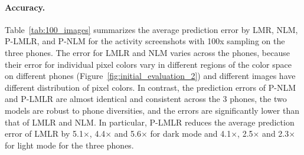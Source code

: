 \paragraph{Accuracy.}
Table~\ref{tab:100_images}
summarizes the average prediction error by LMR, NLM, P-LMLR, and P-NLM
for the activity screenshots with 100x sampling on the three phones.
The error for LMLR and NLM varies across the phones,
because their error for individual pixel colors vary in different regions of the color space
on different phones (Figure~\ref{fig:initial_evaluation_2})
and different images have different distribution of pixel colors.
In contrast, the prediction errors of P-NLM and P-LMLR are
almost identical and consistent across the 3 phones,
\ie the two models are robust to phone diversities,
and the errors are significantly lower than that of LMLR and NLM.
In particular, P-LMLR reduces the average prediction error
of LMLR by
    5.1$\times$, 4.4$\times$ and 5.6$\times$ for dark mode
    and 4.1$\times$, 2.5$\times$ and 2.3$\times$ for light mode for the three phones.


